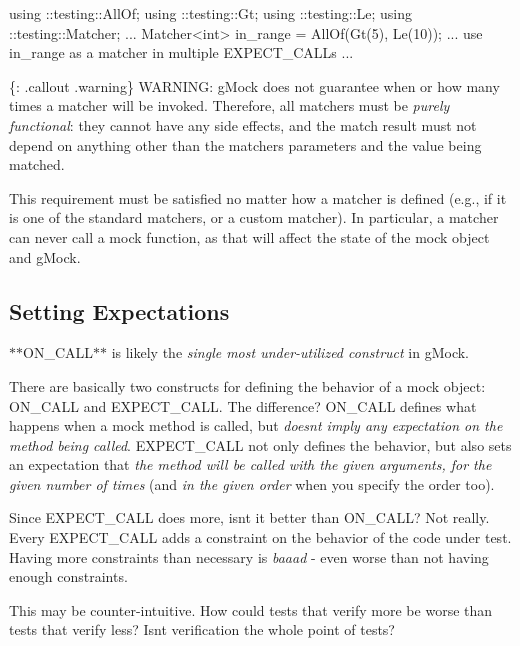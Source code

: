 \begin{DoxyCode}
using ::testing::AllOf;
using ::testing::Gt;
using ::testing::Le;
using ::testing::Matcher;
...
  Matcher<int> in\_range = AllOf(Gt(5), Le(10));
  ... use in\_range as a matcher in multiple EXPECT\_CALLs ...
\end{DoxyCode}


\{\+: .callout .warning\} W\+A\+R\+N\+I\+NG\+: g\+Mock does not guarantee when or how many times a matcher will be invoked. Therefore, all matchers must be {\itshape purely functional}\+: they cannot have any side effects, and the match result must not depend on anything other than the matcher\textquotesingle{}s parameters and the value being matched.

This requirement must be satisfied no matter how a matcher is defined (e.\+g., if it is one of the standard matchers, or a custom matcher). In particular, a matcher can never call a mock function, as that will affect the state of the mock object and g\+Mock.

\subsection*{Setting Expectations}

$\ast$$\ast${\ttfamily O\+N\+\_\+\+C\+A\+LL}$\ast$$\ast$ is likely the {\itshape single most under-\/utilized construct} in g\+Mock.

There are basically two constructs for defining the behavior of a mock object\+: {\ttfamily O\+N\+\_\+\+C\+A\+LL} and {\ttfamily E\+X\+P\+E\+C\+T\+\_\+\+C\+A\+LL}. The difference? {\ttfamily O\+N\+\_\+\+C\+A\+LL} defines what happens when a mock method is called, but {\itshape doesn\textquotesingle{}t imply any expectation on the method being called}. {\ttfamily E\+X\+P\+E\+C\+T\+\_\+\+C\+A\+LL} not only defines the behavior, but also sets an expectation that {\itshape the method will be called with the given arguments, for the given number of times} (and {\itshape in the given order} when you specify the order too).

Since {\ttfamily E\+X\+P\+E\+C\+T\+\_\+\+C\+A\+LL} does more, isn\textquotesingle{}t it better than {\ttfamily O\+N\+\_\+\+C\+A\+LL}? Not really. Every {\ttfamily E\+X\+P\+E\+C\+T\+\_\+\+C\+A\+LL} adds a constraint on the behavior of the code under test. Having more constraints than necessary is {\itshape baaad} -\/ even worse than not having enough constraints.

This may be counter-\/intuitive. How could tests that verify more be worse than tests that verify less? Isn\textquotesingle{}t verification the whole point of tests?

